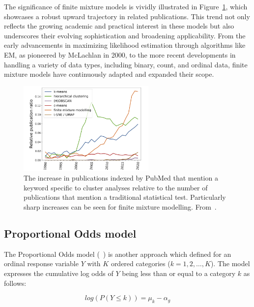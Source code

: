 \documentclass{article}
\begin{document}
The significance of finite mixture models is vividly illustrated in Figure~\ref{fig:trend}, which showcases a robust upward trajectory in related publications. This trend not only reflects the growing academic and practical interest in these models but also underscores their evolving sophistication and broadening applicability. From the early advancements in maximizing likelihood estimation through algorithms like EM, as pioneered by McLachlan in 2000, to the more recent developments in handling a variety of data types, including binary, count, and ordinal data, finite mixture models have continuously adapted and expanded their scope.

\begin{figure}[ht!] %
    \centering %
    \includegraphics[width=0.6\textwidth]{images/trend.png} %
    \caption{The increase in publications indexed by PubMed that mention a keyword specific to cluster analyses relative to the number of publications 
    that mention a traditional statistical test. 
    Particularly sharp increases can be seen for finite mixture modelling.
    From~\cite{dalmaijer2022statistical}.} %
    \label{fig:trend} %
  \end{figure}

\subsection{Proportional Odds model}

The Proportional Odds model (~\cite{mccullagh1980regression}) is another approach which defined for an ordinal response variable $Y$ with $K$ ordered categories ($k=1, 2, \ldots, K$). 
The model expresses the cumulative log odds of $Y$ being less than or equal to a category $k$ as follows:

\begin{equation}
log(P(Y \leq k )) = \mu_k - \alpha_g
\end{equation}
\end{document}
